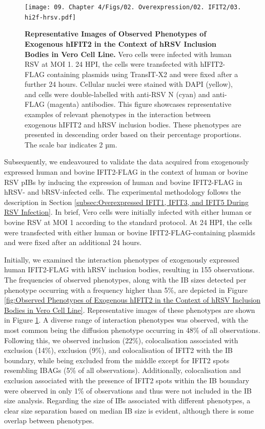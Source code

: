\begin{figure}
    \centering
    \texttt{[image: 09. Chapter 4/Figs/02. Overexpression/02. IFIT2/03. hi2f-hrsv.pdf]}
    \caption[Representative Images of Observed Phenotypes of Exogenous hIFIT2 in the Context of hRSV Inclusion Bodies in Vero Cell Line.]{\textbf{Representative Images of Observed Phenotypes of Exogenous hIFIT2 in the Context of hRSV Inclusion Bodies in Vero Cell Line.} Vero cells were infected with human RSV at MOI 1. 24 HPI, the cells were transfected with hIFIT2-FLAG containing plasmids using TransIT-X2 and were fixed after a further 24 hours. Cellular nuclei were stained with DAPI (yellow), and cells were double-labelled with anti-RSV N (cyan) and anti-FLAG (magenta) antibodies. This figure showcases representative examples of relevant phenotypes in the interaction between exogenous hIFIT2 and hRSV inclusion bodies. These phenotypes are presented in descending order based on their percentage proportions. The scale bar indicates 2 µm.}
    \label{fig:Representative Images of Observed Phenotypes of Exogenous hIFIT2 in the Context of hRSV Inclusion Bodies in Vero Cell Line}
\end{figure}

Subsequently, we endeavoured to validate the data acquired from exogenously expressed human and bovine IFIT2-FLAG in the context of human or bovine RSV pIBs by inducing the expression of human and bovine IFIT2-FLAG in hRSV- and bRSV-infected cells. The experimental methodology follows the description in Section \ref{subsec:Overexpressed IFIT1, IFIT3, and IFIT5 During RSV Infection}. In brief, Vero cells were initially infected with either human or bovine RSV at MOI 1 according to the standard protocol. At 24 HPI, the cells were transfected with either human or bovine IFIT2-FLAG-containing plasmids and were fixed after an additional 24 hours.

Initially, we examined the interaction phenotypes of exogenously expressed human IFIT2-FLAG with hRSV inclusion bodies, resulting in 155 observations. The frequencies of observed phenotypes, along with the IB sizes detected per phenotype occurring with a frequency higher than 5\%, are depicted in Figure \ref{fig:Observed Phenotypes of Exogenous hIFIT2 in the Context of hRSV Inclusion Bodies in Vero Cell Line}. Representative images of these phenotypes are shown in Figure \ref{fig:Representative Images of Observed Phenotypes of Exogenous hIFIT2 in the Context of hRSV Inclusion Bodies in Vero Cell Line}. A diverse range of interaction phenotypes was observed, with the most common being the diffusion phenotype occurring in 48\% of all observations. Following this, we observed inclusion (22\%), colocalisation associated with exclusion (14\%), exclusion (9\%), and colocalisation of IFIT2 with the IB boundary, while being excluded from the middle except for IFIT2 spots resembling IBAGs (5\% of all observations). Additionally, colocalisation and exclusion associated with the presence of IFIT2 spots within the IB boundary were observed in only 1\% of observations and thus were not included in the IB size analysis. Regarding the size of IBs associated with different phenotypes, a clear size separation based on median IB size is evident, although there is some overlap between phenotypes.

